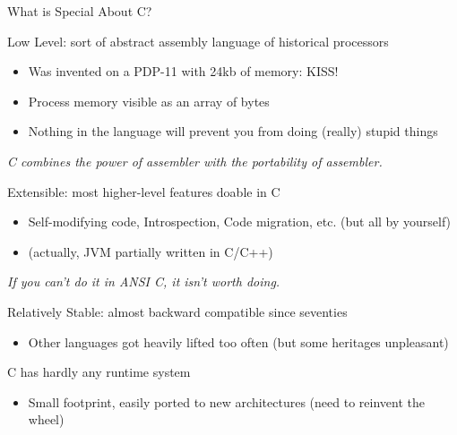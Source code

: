 \begin{frame}[squeeze]{What is Special About C?}
  \begin{block}{Low Level: sort of abstract assembly language of historical
      processors}
    \begin{itemize}
    \item Was invented on a PDP-11 with 24kb of memory: KISS!
    \item Process memory visible as an array of bytes
    \item Nothing in the language will prevent you from doing (really) stupid
      things
    \end{itemize}
    \textit{\small C combines the power of assembler with the portability of
      assembler.}

  \end{block}  
  \begin{block}{Extensible: most higher-level features doable in C}
    \begin{itemize}
    \item Self-modifying code, Introspection, Code migration, etc.
      (but all by yourself)
    \item (actually, JVM partially written in C/C++)
    \end{itemize}
    \textit{\small If you can't do it in ANSI C, it isn't worth doing.}
  \end{block}

  \begin{block}{Relatively Stable: almost backward compatible since seventies}
    \begin{itemize}
    \item Other languages got heavily lifted too often (but some heritages
      unpleasant)
    \end{itemize}
  \end{block}

  \begin{block}{C has hardly any runtime system}
    \begin{itemize}
    \item Small footprint, easily ported to new architectures 
      {\small (need to reinvent the wheel)}
    \end{itemize}
  \end{block}
\end{frame}
